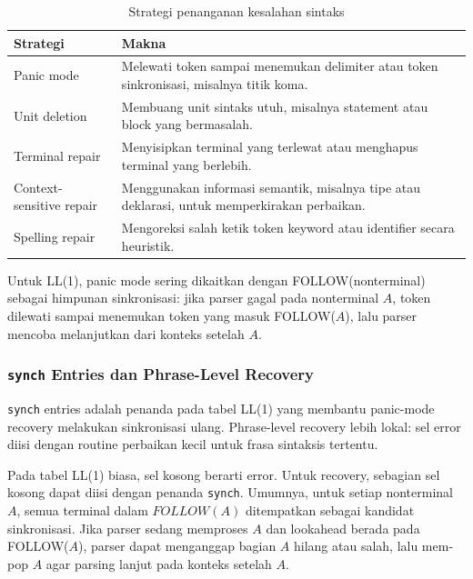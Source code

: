 \begin{table}[H]
\centering
\begin{tabularx}{\textwidth}{|L{0.25\textwidth}|X|}
\hline
\textbf{Strategi} & \textbf{Makna} \\
\hline
Panic mode & Melewati token sampai menemukan delimiter atau token sinkronisasi, misalnya titik koma. \\
\hline
Unit deletion & Membuang unit sintaks utuh, misalnya statement atau block yang bermasalah. \\
\hline
Terminal repair & Menyisipkan terminal yang terlewat atau menghapus terminal yang berlebih. \\
\hline
Context-sensitive repair & Menggunakan informasi semantik, misalnya tipe atau deklarasi, untuk memperkirakan perbaikan. \\
\hline
Spelling repair & Mengoreksi salah ketik token keyword atau identifier secara heuristik. \\
\hline
\end{tabularx}
\caption{Strategi penanganan kesalahan sintaks}
\label{tab:error-recovery-ll1}
\end{table}

Untuk LL(1), panic mode sering dikaitkan dengan FOLLOW(nonterminal) sebagai himpunan sinkronisasi: jika parser gagal pada nonterminal $A$, token dilewati sampai menemukan token yang masuk FOLLOW($A$), lalu parser mencoba melanjutkan dari konteks setelah $A$.

\subsubsection{\texorpdfstring{\texttt{synch} Entries dan Phrase-Level Recovery}{synch Entries dan Phrase-Level Recovery}}

\begin{jawab}
\texttt{synch} entries adalah penanda pada tabel LL(1) yang membantu panic-mode recovery melakukan sinkronisasi ulang. Phrase-level recovery lebih lokal: sel error diisi dengan routine perbaikan kecil untuk frasa sintaksis tertentu.
\end{jawab}

Pada tabel LL(1) biasa, sel kosong berarti error. Untuk recovery, sebagian sel kosong dapat diisi dengan penanda \texttt{synch}. Umumnya, untuk setiap nonterminal $A$, semua terminal dalam $FOLLOW(A)$ ditempatkan sebagai kandidat sinkronisasi. Jika parser sedang memproses $A$ dan lookahead berada pada FOLLOW($A$), parser dapat menganggap bagian $A$ hilang atau salah, lalu mem-pop $A$ agar parsing lanjut pada konteks setelah $A$.

